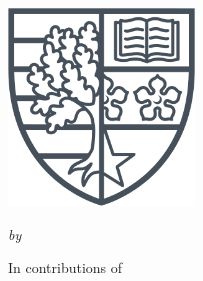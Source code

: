\begin{center}
\vspace*{15pt}\par
{}

\begin{spacing}{1.8}
{\Large\bfseries\MakeLowercase{\capitalisewords{\thesisTitle}}}\\
\end{spacing}

\vspace{40pt}\par
\includegraphics[width=140pt]{Figures/logo}\\
\vspace{40pt}\par


{\itshape\fontsize{15.5pt}{19pt}\selectfont by\\}\vspace{15pt}\par

{
\LARGE \authorName
}\vspace{55pt}\par

{
\large In contributions of \\ \vspace{8pt} \Large\slshape\contribution\\
}

\vspace{35pt}\par

{\scshape{} \institution\\ \school\\ \university\\
}

\vspace{50pt}\par


{\large \monthDate\ \yearDate}

\vfill

\end{center}

